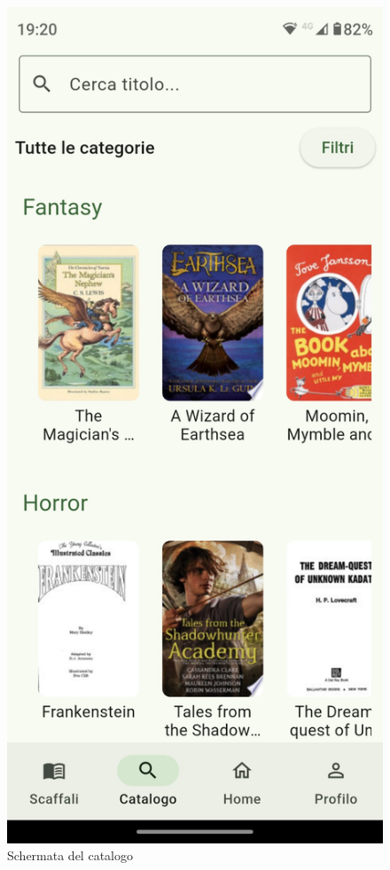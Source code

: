 \documentclass{article}
\begin{document}
\begin{figure}[H]
  \centering
  \includegraphics[width=0.6\linewidth]{catalog-f.png}
  \caption{Schermata del catalogo}
  \label{fig:sitemap}
\end{figure}
\end{document}
